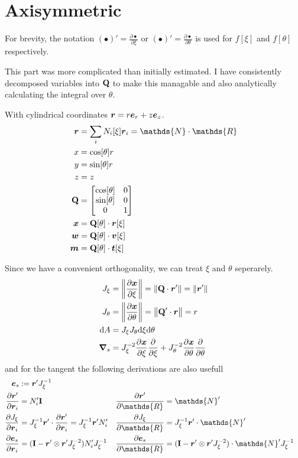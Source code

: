\documentclass[a4paper,11pt]{article}
\renewcommand{\to}[1]{\text{\boldmath $#1$}} %
\newcommand{\ts}[1]{\text{\boldmath $\mathrm{#1}$}} %
\newcommand{\uv}[1]{\mathds{#1}}
\newcommand{\um}[1]{\mathds{#1}}
\newcommand{\intd}[1]{\mathrm{d}#1}
\newcommand{\pderiv}[2]{\frac{\partial#1}{\partial#2}}
\newcommand{\norm}[1]{\left\lVert{#1}\right\rVert}
\newcommand{\defeq}{:=}
\begin{document}
\section{Axisymmetric}
For brevity, the notation $(\bullet)' = \pderiv{\bullet}{\xi}$ or $(\bullet)' = \pderiv{\bullet}{\theta}$ is used for $f[\xi]$ and $f[\theta]$ respectively.

This part was more complicated than initially estimated.
I have consistently decomposed variables into $\ts Q$ to make this managable and also analytically calculating the integral over $\theta$.

With cylindrical coordinates $\to r = r\to e_r + z \to e_z$.
\begin{align}
 \to r &= \sum_i N_i[\xi]\to r_i = \um N\cdot \uv R\\
 x &= \cos[\theta] r\\
 y &= \sin[\theta] r\\
 z &= z\\
 \ts Q &= \begin{bmatrix}\cos[\theta] & 0\\ \sin[\theta] & 0\\ 0 & 1\end{bmatrix}\\
 \to x &= \ts Q[\theta] \cdot \to r[\xi]\\
 \to w &= \ts Q[\theta] \cdot \to v[\xi]\\
 \to m &= \ts Q[\theta] \cdot \to t[\xi]
\end{align}

Since we have a convenient orthogonality, we can treat $\xi$ and $\theta$ seperarely.
\begin{align}
 J_\xi &= \norm{\pderiv{\to x}{\xi}} = \norm{\ts Q \cdot \to r'} = \norm{\to r'}\\
 J_\theta &= \norm{\pderiv{\to x}{\theta}} = \norm{\ts Q' \cdot \to r} = r \\
 \intd A &= J_\xi J_\theta \intd \xi \intd \theta \\
 \to\nabla_s &= J_\xi^{-2} \pderiv{\to x}{\xi}\pderiv{}{\xi} + J_\theta^{-2} \pderiv{\to x}{\theta}\pderiv{}{\theta}
\end{align}
and for the tangent the following derivations are also usefull
\begin{align}
 \to e_s &\defeq \to r' J_\xi^{-1} \\
 \pderiv{\to r'}{\to r_i} &= N_i' \ts I
	& \pderiv{\to r'}{\uv R} &= \um N'\\
 \pderiv{J_\xi}{\to r_i} &= J_\xi^{-1} \to r'\cdot \pderiv{\to r'}{\to r_i} = J_\xi^{-1} \to r'N_i'
	& \pderiv{J_\xi}{\uv R} &= J_\xi^{-1} \to r'\cdot \um N' \\
 \pderiv{\to e_s}{\to r_i} &= (\ts I - \to r'\otimes\to r' J_\xi^{-2})N_i' J_\xi^{-1}
	& \pderiv{\to e_s}{\uv R} &= (\ts I - \to r'\otimes \to r'J_\xi^{-2})\cdot \um N' J_\xi^{-1}
\end{align}
\end{document}
